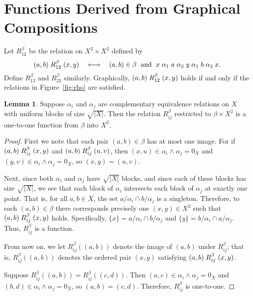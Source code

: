 \documentclass{amsart}
\theoremstyle{plain}
\theoremstyle{definition}
\newtheorem{lemma}{Lemma}
\theoremstyle{definition}
\numberwithin{equation}{section}
\newcommand{\<}{\ensuremath{\langle}}
\renewcommand{\>}{\ensuremath{\rangle}}
\newcommand{\rel}{\ensuremath{\mathrel}}
\newcommand{\ralpha}{\ensuremath{\mathrel{\alpha}}}
\newcommand{\meet}{\ensuremath{\wedge}}
\begin{document}
\section{Functions Derived from Graphical Compositions}
Let $R_{12}^\beta$ be the relation on $X^2 \times X^2$ defined by 
\[
(a,b) \rel{R_{12}^\beta} (x,y) \quad \longleftrightarrow \quad 
(a,b) \in \beta \; \text{ and } \;
x \ralpha_1 a \ralpha_2 y \ralpha_1 b \ralpha_2 x.
\]
Define $R_{13}^\beta$ and $R_{23}^\beta$ similarly.  Graphically, 
$(a,b) \rel{R_{12}^\beta} (x,y)$ holds if and only if the relations in
Figure~\ref{fig:rho} are satisfied.
\begin{lemma}
\label{lem:injection}
Suppose $\alpha_i$ and $\alpha_j$ are complementary equivalence
relations on $X$ with uniform blocks of size $\sqrt{|X|}$.
Then the relation $R_{ij}^\beta$ restricted to $\beta\times X^2$ is
  a one-to-one function from $\beta$ into $X^2$.
\end{lemma}
\begin{proof}
First we note that each pair $(a,b)\in \beta$ has at most one image. For if
$(a,b) \rel{R_{ij}^\beta} (x,y)$ and $(a,b) \rel{R_{ij}^\beta} (u,v)$, then 
$(x,u) \in  \alpha_i \meet \alpha_j = 0_X$ and 
$(y,v) \in  \alpha_i \meet \alpha_j = 0_X$, so $(x,y) = (u,v)$.

Next,
since both $\alpha_i$ and $\alpha_j$ have 
$\sqrt{|X|}$ blocks, and since each of these blocks has size $\sqrt{|X|}$, we
see that each block of $\alpha_i$ intersects each block of $\alpha_j$ at
exactly one point.  That is, for all $a, b \in X$, the set 
$a/\alpha_i \cap b/\alpha_j$ is a singleton.
Therefore, to each $(a,b)\in \beta$ there corresponds precisely one $(x,y)\in
X^2$ such that $(a,b) \rel{R_{ij}^\beta} (x,y)$ holds.  
Specifically, $\{x\} = a/\alpha_i \cap b/\alpha_j$ and 
$\{y\} = b/\alpha_i \cap a/\alpha_j$. 
Thus,  $R_{ij}^\beta$ is a function.  

From now on, we let 
$R_{ij}^\beta((a,b))$ denote the image of $(a,b)$ under $R_{ij}^\beta$; that
is, $R_{ij}^\beta((a,b))$ denotes the ordered pair $(x,y)$
satisfying $(a,b) \rel{R_{ij}^\beta} (x,y)$.


Suppose $R_{ij}^\beta((a,b)) = R_{ij}^\beta((c,d))$. Then 
$(a,c) \in \alpha_i\meet \alpha_j = 0_X$
and
$(b,d) \in \alpha_i\meet \alpha_j = 0_X$, so $(a,b) = (c,d)$.
Therefore,  $R_{ij}^\beta$ is one-to-one.
\end{proof}
\end{document}
